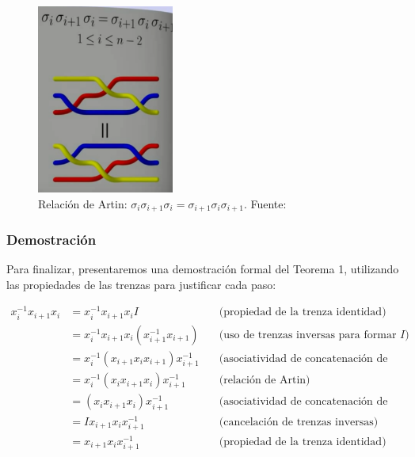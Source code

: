 \begin{figure}[!h]
    \centering
    \includegraphics[width=0.4\textwidth]{figures/chapters/2_artin/teorema1.png}
    \caption{Relación de Artin: \(\sigma_i \sigma_{i+1} \sigma_i = \sigma_{i+1} \sigma_i \sigma_{i+1}\). Fuente: \cite{esterdalvitBraidsChapter12013}}
    \label{fig:relacion_artin_1}
\end{figure}

\subsubsection*{Demostración}

Para finalizar, presentaremos una demostración formal del Teorema 1, utilizando las propiedades de las trenzas para justificar cada paso:

\begin{align*}
    x_i^{-1} x_{i+1} x_i &= x_i^{-1} x_{i+1} x_i I \quad &\text{(propiedad de la trenza identidad)} \\
    &= x_i^{-1} x_{i+1} x_i (x_{i+1}^{-1} x_{i+1}) \quad &\text{(uso de trenzas inversas para formar } I\text{)} \\
    &= x_i^{-1} (x_{i+1} x_i x_{i+1}) x_{i+1}^{-1} \quad &\text{(asociatividad de concatenación de trenzas)} \\
    &= x_i^{-1} (x_i x_{i+1} x_i) x_{i+1}^{-1} \quad &\text{(relación de Artin)} \\
    &= \left( x_i x_{i+1} x_i \right) x_{i+1}^{-1} \quad &\text{(asociatividad de concatenación de trenzas)} \\
    &= I x_{i+1} x_i x_{i+1}^{-1} \quad &\text{(cancelación de trenzas inversas)} \\
    &= x_{i+1} x_i x_{i+1}^{-1} \quad &\text{(propiedad de la trenza identidad)}
\end{align*}

